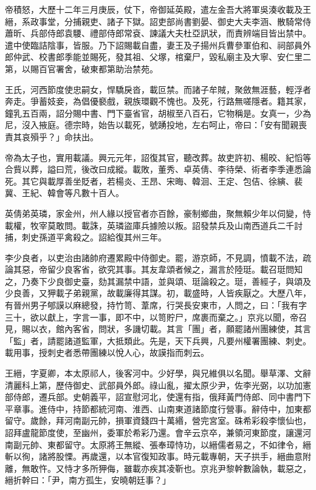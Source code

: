 \begin{pinyinscope}
 帝積怒，大歷十二年三月庚辰，仗下，帝御延英殿，遣左金吾大將軍吳湊收載及王縉，系政事堂，分捕親吏、諸子下獄。詔吏部尚書劉晏、御史大夫李涵、散騎常侍蕭昕、兵部侍郎袁騕、禮部侍郎常袞、諫議大夫杜亞訊狀，而責辨端目皆出禁中。遣中使臨詰陰事，皆服。乃下詔賜載自盡，妻王及子揚州兵曹參軍伯和、祠部員外郎仲武、校書郎季能並賜死，發其祖、父塚，棺棄尸，毀私廟主及大寧、安仁里二第，以賜百官署舍，破東都第助治禁苑。



 王氏，河西節度使忠嗣女，悍驕戾沓，載叵禁。而諸子牟賊，聚斂無涯藝，輕浮者奔走。爭蓄妓妾，為倡優褻戲，親族環觀不愧也。及死，行路無嗟隱者。籍其家，鐘乳五百兩，詔分賜中書、門下臺省官，胡椒至八百石，它物稱是。女真一，少為尼，沒入掖庭。德宗時，始告以載死，號踴投地，左右呵止，帝曰：「安有聞親喪責其哀殞乎？」命扶出。



 帝為太子也，實用載議。興元元年，詔復其官，聽改葬。故吏許初、楊晈、紀慆等合貲以葬，謚曰荒，後改曰成縱。載敗，董秀、卓英倩、李待榮、術者李季連悉論死。其它與載厚善坐貶者，若楊炎、王昂、宋晦、韓洄、王定、包佶、徐縯、裴冀、王紀、韓會等凡數十百人。



 英倩弟英璘，家金州，州人緣以授官者亦百餘，豪制鄉曲，聚無賴少年以伺變，恃載權，牧宰莫敢問。載誅，英璘盜庫兵據險以叛。詔發禁兵及山南西道兵二千討捕，刺史孫道平禽殺之。詔給復其州三年。



 李少良者，以吏治由諸帥府遷累殿中侍御史。罷，游京師，不見調，憤載不法，疏論其惡，帝留少良客省，欲究其事。其友韋頌者候之，漏言於陸珽。載召珽問知之，乃奏下少良御史臺，劾其漏禁中語，並與頌、珽論殺之。珽，善經子，與頌及少良善，又狎載子弟親黨，故載廉得其謀。初，載盛時，人皆疾厭之。大歷八年，有晉州男子郇謨以麻總發，持竹笥、葦席，行哭長安東市，人問之，曰：「我有字三十，欲以獻上，字言一事，即不中，以笥貯尸，席裹而棄之。」京兆以聞，帝召見，賜以衣，館內客省，問狀，多譏切載。其言「團」者，願罷諸州團練使，其言「監」者，請罷諸道監軍，大抵類此。先是，天下兵興，凡要州權署團練、刺史。載用事，授刺史者悉帶團練以悅人心，故謨指而刺云。



 王縉，字夏卿，本太原祁人，後客河中。少好學，與兄維俱以名聞。舉草澤、文辭清麗科上第，歷侍御史、武部員外郎。祿山亂，擢太原少尹，佐李光弼，以功加憲部侍郎，遷兵部。史朝義平，詔宣慰河北，使還有指，俄拜黃門侍郎、同中書門下平章事。進侍中，持節都統河南、淮西、山南東道諸節度行營事。辭侍中，加東都留守。歲餘，拜河南副元帥，損軍資錢四十萬緡，營完宮室。硃希彩殺李懷仙也，詔拜盧龍節度使，至幽州，委軍於希彩乃還。會辛云京卒，兼領河東節度，讓還河南副元帥、東都留守。太原將王無縱、張奉璋恃功，以縉儒者易之，不如律令，縉斬以徇，諸將股慄。再歲還，以本官復知政事。時元載專朝，天子拱手，縉曲意附離，無敢忤。又恃才多所狎侮，雖載亦疾其凌靳也。京兆尹黎幹數論執，載惡之，縉折幹曰：「尹，南方孤生，安曉朝廷事？」




\end{pinyinscope}
